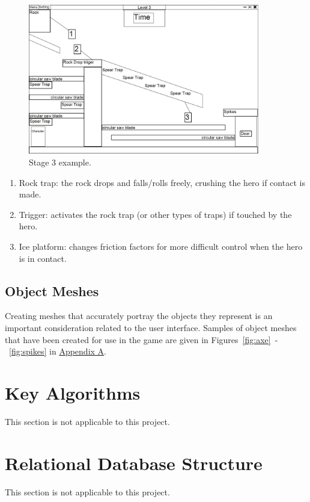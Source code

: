 \documentclass[12pt, titlepage]{article}
\begin{document}
\newpage

\begin{figure}[hTB]
\begin{center}
\includegraphics[width=0.90\textwidth]{stage3}
\caption{Stage 3 example.} \label{fig:stage3}
\end{center}
\end{figure}


\begin{enumerate}
  \item Rock trap: the rock drops and falls/rolls freely, crushing the hero if contact is made.
  \item Trigger: activates the rock trap (or other types of traps) if touched by the hero.
  \item Ice platform: changes friction factors for more difficult control when the hero is in contact.
\end{enumerate}

\subsection{Object Meshes}
Creating meshes that accurately portray the objects they represent is an important consideration related to the user interface.   Samples of object meshes that have been created for use in the game are given in Figures~\ref*{fig:axe}~-~\ref*{fig:spikes} in \hyperref[sec:app]{Appendix A}.


\section{Key Algorithms}
This section is not applicable to this project.

\section{Relational Database Structure}
This section is not applicable to this project.
\end{document}
